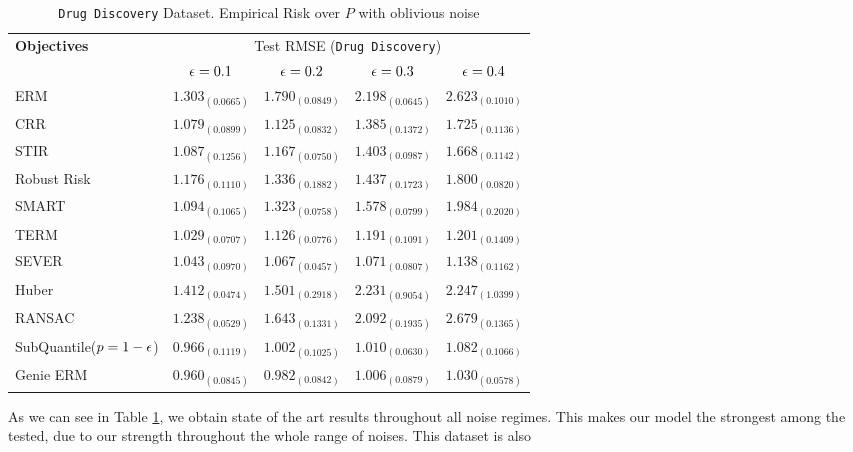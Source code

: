 \documentclass{article} %
\newcommand{\subhead}[1]{\multicolumn{1}{c}{#1}}%
\begin{document}
	\begin{table}[!h]
		\centering
		\begin{tabular}{lcccc}
			\toprule 
			\textbf{Objectives}&\multicolumn{4}{c}{Test RMSE (\texttt{Drug Discovery})}\\                   
			\cmidrule(rl){2-5}
			&\subhead{${\epsilon} = 0.1$}& \subhead{${\epsilon} = 0.2$}& \subhead{${\epsilon} = 0.3$}& \subhead{${\epsilon} = 0.4$}\\ 
			\midrule
			ERM  &$1.303_{(0.0665)}$&$1.790_{(0.0849)}$&$2.198_{(0.0645)}$&$2.623_{(0.1010)}$\\
			CRR \cite{bhatia2017}  &$1.079_{(0.0899)}$&$1.125_{(0.0832)}$&$1.385_{(0.1372)}$&$1.725_{(0.1136)}$\\
			STIR \cite{pmlr-v89-mukhoty19a} &$1.087_{(0.1256)}$&$1.167_{(0.0750)}$&$1.403_{(0.0987)}$&$1.668_{(0.1142)}$\\
			Robust Risk \cite{RRM} &$1.176_{(0.1110)}
			$&$1.336_{(0.1882)}$&$1.437_{(0.1723)}$&$1.800_{(0.0820)}$\\
			SMART \cite{https://doi.org/10.48550/arxiv.2206.04777} &$1.094_{(0.1065)}$&$1.323_{(0.0758)}$&$1.578_{(0.0799)}$&$1.984_{(0.2020)}$\\
			TERM \cite{li2020tilted} &$\mathbf{1.029_{(0.0707)}}$&$1.126_{(0.0776)}$&$1.191_{(0.1091)}$&$1.201_{(0.1409)}$\\
			SEVER \cite{DiakonikolasKKLSS19} &$1.043_{(0.0970)}$&$\mathbf{1.067_{(0.0457)}}$&$\mathbf{1.071_{(0.0807)}}$&$\mathbf{1.138_{(0.1162)}}$\\
			Huber \cite{Huber2009} &$1.412_{(0.0474)}$&$1.501_{(0.2918)}$&$2.231_{(0.9054)}$&$2.247_{(1.0399)}$\\
			RANSAC \cite{RANSAC1981} &$1.238_{(0.0529)}$&$1.643_{(0.1331)}$&$2.092_{(0.1935)}$&$2.679_{(0.1365)}$\\
			\rowcolor{LightCyan}
			SubQuantile($p = 1-{\epsilon}$) &$\mathbf{0.966_{(0.1119)}}$&$\mathbf{1.002_{(0.1025)}}$&$\mathbf{1.010_{(0.0630)}}$&$\mathbf{1.082_{(0.1066)}}$\\
			\midrule 
			Genie ERM &$0.960_{(0.0845)}$&$0.982_{(0.0842)}$&$1.006_{(0.0879)}$&$1.030_{(0.0578)}$\\
			\bottomrule
		\end{tabular}
		\caption{\texttt{Drug Discovery} Dataset. Empirical Risk over $P$ with oblivious noise}
		\label{tab:drug-discovery}
	\end{table}
	
	As we can see in Table \ref{tab:drug-discovery}, we obtain state of the art results throughout all noise regimes. This makes our model the strongest among the tested, due to our strength throughout the whole range of noises. This dataset is also 
	
\end{document}
